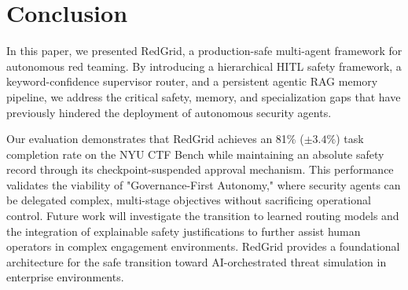 \documentclass[conference,compsoc]{IEEEtran}
\begin{document}
\section{Conclusion} \label{sec:conclusion}
In this paper, we presented RedGrid, a production-safe multi-agent framework for autonomous red teaming. By introducing a hierarchical HITL safety framework, a keyword-confidence supervisor router, and a persistent agentic RAG memory pipeline, we address the critical safety, memory, and specialization gaps that have previously hindered the deployment of autonomous security agents. 

Our evaluation demonstrates that RedGrid achieves an 81\% ($\pm 3.4\%$) task completion rate on the NYU CTF Bench while maintaining an absolute safety record through its checkpoint-suspended approval mechanism. This performance validates the viability of "Governance-First Autonomy," where security agents can be delegated complex, multi-stage objectives without sacrificing operational control. Future work will investigate the transition to learned routing models and the integration of explainable safety justifications to further assist human operators in complex engagement environments. RedGrid provides a foundational architecture for the safe transition toward AI-orchestrated threat simulation in enterprise environments.



\end{document}
